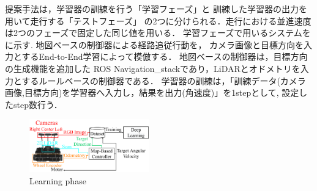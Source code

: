 \documentclass[10pt]{jarticle}
\begin{document}
    提案手法は，学習器の訓練を行う「学習フェーズ」と
    訓練した学習器の出力を用いて走行する「テストフェーズ」
    の2つに分けられる．走行における並進速度は2つのフェーズで固定した同じ値を用いる．
    学習フェーズで用いるシステムをに示す.
    地図ベースの制御器による経路追従行動を，
    カメラ画像と目標方向を入力とするEnd-to-End学習によって模倣する．
    地図ベースの制御器は，目標方向の生成機能を追加した
    ROS Navigation\_stack\cite{navigation}であり，LiDARとオドメトリを入力とするルールベースの制御器である．
    学習器の訓練は，「訓練データ(カメラ画像,目標方向)を学習器へ入力し，結果を出力(角速度)」を1stepとして,
    設定したstep数行う．
    \begin{center}
        \begin{figure}[h]
            \centering
            \includegraphics[width=0.46\textwidth]{./fig/system_learning.pdf}
            \caption{Learning phase}
            \label{fig:system_learning}
        \end{figure}
    \end{center}
\end{document}
